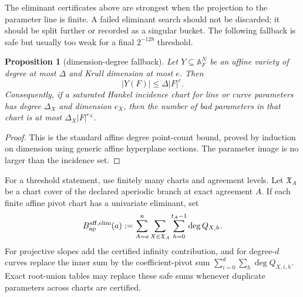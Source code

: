 \documentclass[11pt]{article}
\newtheorem{proposition}[theorem]{Proposition}
\theoremstyle{definition}
\theoremstyle{remark}
\begin{document}
The eliminant certificates above are strongest when the projection to the
parameter line is finite.  A failed eliminant search should not be discarded; it
should be split further or recorded as a singular bucket.  The following fallback
is safe but usually too weak for a final $2^{-128}$ threshold.

\begin{proposition}[dimension-degree fallback]
\label{prop:dimension-degree-fallback}
Let $Y\subseteq\mathbb A^N_F$ be an affine variety of degree at most $\Delta$ and
Krull dimension at most $e$.  Then
\[
        |Y(F)|\le \Delta |F|^e .
\]
Consequently, if a saturated Hankel incidence chart for line or curve parameters
has degree $\Delta_X$ and dimension $e_X$, then the number of bad parameters in
that chart is at most $\Delta_X|F|^{e_X}$.
\end{proposition}

\begin{proof}
This is the standard affine degree point-count bound, proved by induction on
dimension using generic affine hyperplane sections.  The parameter image is no
larger than the incidence set.
\end{proof}

For a threshold statement, use finitely many charts and agreement levels.  Let
$\mathfrak X_A$ be a chart cover of the declared aperiodic branch at exact
agreement $A$.  If each finite affine pivot chart has a univariate eliminant, set
\[
        B_{\rm ap}^{\rm aff,elim}(a)
        :=\sum_{A=a}^n\sum_{X\in\mathfrak X_A}
          \sum_{h=0}^{t_A-1}\deg Q_{X,h} .
\]
For projective slopes add the certified infinity contribution, and for degree-$d$
curves replace the inner sum by the coefficient-pivot sum
$\sum_{i=0}^d\sum_h\deg Q_{X,i,h}$.  Exact root-union tables may replace these
safe sums whenever duplicate parameters across charts are certified.
\end{document}
